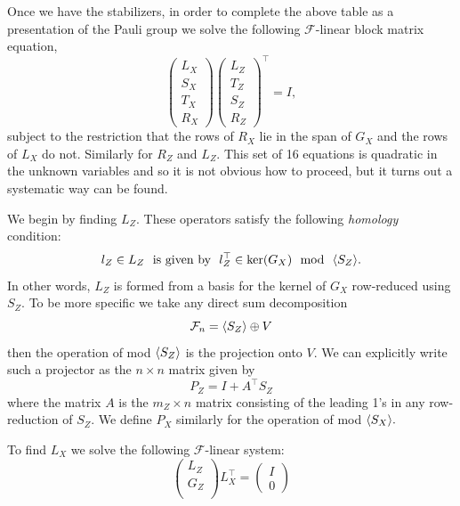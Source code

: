 \documentclass[12pt]{article}
\newcommand{\Field}{\mathcal{F}}
\def\Ker{\mathrm{ker}}
\begin{document}
Once we have the stabilizers, in order to
complete the above table as a presentation
of the Pauli group we solve the
following $\Field$-linear block matrix equation,
$$
\left( \begin{array}{l}
L_X\\
S_X\\
T_X\\
R_X
\end{array} \right)
\left( \begin{array}{l}
L_Z\\
T_Z\\
S_Z\\
R_Z
\end{array} \right)^\top =
I,
$$
subject to the restriction that the rows of
$R_X$ lie in the span of $G_X$ and
the rows of $L_X$ do not.
Similarly for $R_Z$ and $L_Z.$
This set of 16 equations is quadratic in the unknown variables
and so it is not obvious how to proceed, but it turns out a
systematic way can be found.

We begin by finding $L_Z.$
These operators satisfy the following \emph{homology} condition:
$$
    l_Z \in L_Z \smbox{is given by} l_Z^\top \in \Ker(G_X) \smbox{mod} \Span{S_Z}.
$$
In other words, $L_Z$ is formed from a basis for the kernel of $G_X$ 
row-reduced using $S_Z.$
To be more specific %
we take any direct sum decomposition
$$\Fnd = \Span{S_Z} \oplus V$$
then the operation of mod $\langle S_Z \rangle$ is the
projection onto $V.$
We can explicitly write such a 
projector as the $n\times n$
matrix given by
$$
    P_Z = I + A^\top S_Z
$$
where the matrix $A$ is the $m_Z\times n$ matrix consisting of
the leading 1's in any row-reduction of $S_Z.$
We define $P_X$ similarly for the operation of mod $\langle S_X \rangle.$

To find $L_X$ we solve the following $\Field$-linear
system:
$$
\left( \begin{array}{l}
L_Z\\
G_Z\\
\end{array} \right)
L_X^\top = 
\left( \begin{array}{l}
I\\
0
\end{array} \right)
$$
\end{document}

